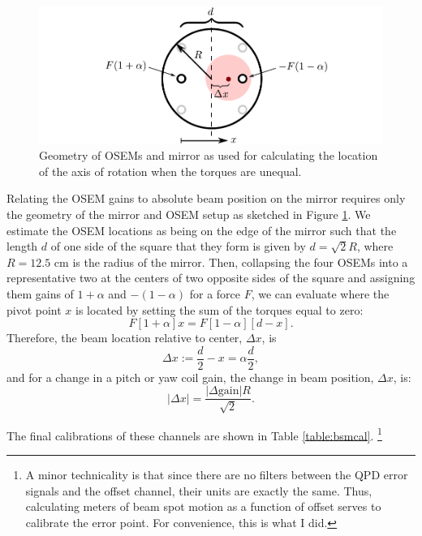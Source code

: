 \begin{figure}
\begin{centering}
\includegraphics{figures/geometry_mirror_osems.pdf}
\caption[Diagram of mirror and OSEM geometry]{Geometry of OSEMs and
  mirror as used for calculating the location of the axis of rotation
  when the torques are unequal.}
\label{fig:mirror_osem_geometry}
\end{centering}
\end{figure}

Relating the OSEM gains to absolute beam position on the mirror
requires only the geometry of the mirror and OSEM setup as sketched in
Figure \ref{fig:mirror_osem_geometry}. We estimate the OSEM locations as
being on the edge of the mirror such that the length $d$ of one side
of the square that they form is given by $d =\sqrt{2} R$, where $R =
12.5$ cm is the radius of the mirror. Then, collapsing the four OSEMs
into a representative two at the centers of two opposite sides of the
square and assigning them gains of $1 + \alpha$ and $-(1-\alpha)$ for
a force $F$, we can evaluate where the pivot point $x$ is located by
setting the sum of the torques equal to zero:
\begin{equation}
F [1+\alpha] x = F [1-\alpha][d-x].
\end{equation}
Therefore, the beam location relative to center, $\Delta x$, is
\begin{equation}
\Delta x := \frac{d}{2} - x = \alpha \frac{d}{2},
\end{equation}
and for a change in a pitch or yaw coil gain, the change in beam
position, $\Delta x$, is:
\begin{equation}
|\Delta{x}| = \frac{|\Delta{\mbox{gain}}| R}{\sqrt{2}} .
\end{equation}

The final calibrations of these channels are shown in Table
\ref{table:bsmcal}. \footnote{A minor technicality is that since there
  are no filters between the QPD error signals and the offset channel,
  their units are exactly the same. Thus, calculating meters of beam
  spot motion as a function of offset serves to calibrate the error
  point. For convenience, this is what I did.}

